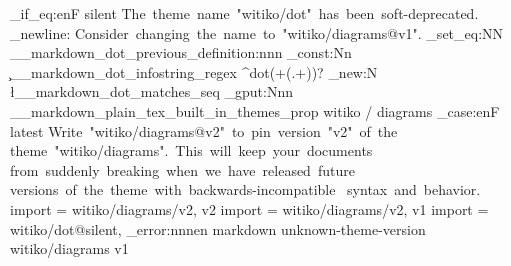   {
    \str_if_eq:enF
      { \markdownThemeVersion }
      { silent }
      {
        \markdownWarning
          {
            The~theme~name~"witiko/dot"~has~been~soft-deprecated.
            \iow_newline:
            Consider~changing~the~name~to~"witiko/diagrams@v1".
          }
      }
    \cs_set_eq:NN
      \__markdown_dot_previous_definition:nnn
      \markdownRendererInputFencedCodePrototype
    \regex_const:Nn
      \c__markdown_dot_infostring_regex
      { ^dot(\s+(.+))? }
    \seq_new:N
      \l__markdown_dot_matches_seq
  }
\prop_gput:Nnn
  \g__markdown_plain_tex_built_in_themes_prop
  { witiko / diagrams }
  {
    \str_case:enF
      { \markdownThemeVersion }
      {
        { latest }
          {
            \markdownWarning
              {
                Write~"witiko/diagrams@v2"~to~pin~version~"v2"~of~the~
                theme~"witiko/diagrams".~This~will~keep~your~documents~
                from~suddenly~breaking~when~we~have~released~future~
                versions~of~the~theme~with~backwards-incompatible~
                syntax~and~behavior.
              }
            \markdownSetup
              {
                import = witiko/diagrams/v2,
              }
          }
        { v2 }
          {
            \markdownSetup
              {
                import = witiko/diagrams/v2,
              }
          }
        { v1 }
          {
            \markdownSetup
              {
                import = witiko/dot@silent,
              }
          }
      }
      {
        \msg_error:nnnen
          { markdown }
          { unknown-theme-version }
          { witiko/diagrams }
          { \markdownThemeVersion }
          { v1 }
      }
  }
